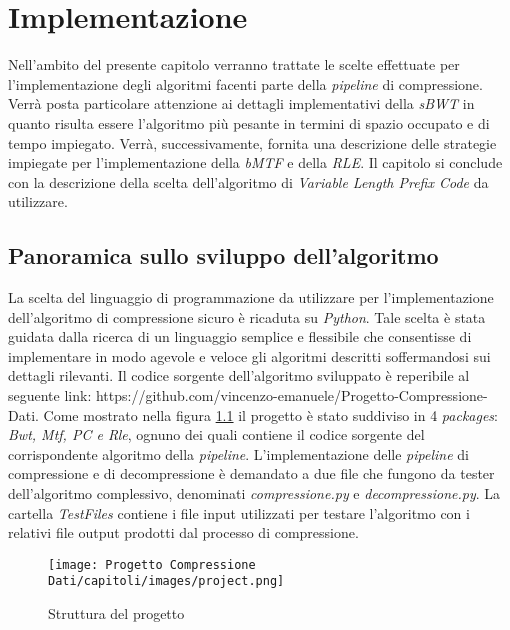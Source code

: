 \chapter{Implementazione} %
%

\begin{citazione}
Nell'ambito del presente capitolo verranno trattate le scelte effettuate per l'implementazione degli algoritmi facenti parte della \emph{pipeline} di compressione. Verrà posta particolare attenzione ai dettagli implementativi della \emph{sBWT} in quanto risulta essere l'algoritmo più pesante in termini di spazio occupato e di tempo impiegato. Verrà, successivamente, fornita una descrizione delle strategie impiegate per l'implementazione della \emph{bMTF} e della \emph{RLE}. Il capitolo si conclude con la descrizione della scelta dell'algoritmo di \emph{Variable Length Prefix Code} da utilizzare. 
\end{citazione}
\newpage

\section{Panoramica sullo sviluppo dell'algoritmo} 
La scelta del linguaggio di programmazione da utilizzare per l'implementazione dell'algoritmo di compressione sicuro è ricaduta su \emph{Python}. Tale scelta è stata guidata dalla ricerca di un linguaggio semplice e flessibile che consentisse di implementare in modo agevole e veloce gli algoritmi descritti soffermandosi sui dettagli rilevanti. Il codice sorgente dell'algoritmo sviluppato è reperibile al seguente link: https://github.com/vincenzo-emanuele/Progetto-Compressione-Dati. Come mostrato nella figura \ref{fig:project} il progetto è stato suddiviso in 4 \emph{packages}: \emph{Bwt, Mtf, PC e Rle}, ognuno dei quali contiene il codice sorgente del corrispondente algoritmo della \emph{pipeline}. L'implementazione delle \emph{pipeline} di compressione e di decompressione è demandato a due file che fungono da tester dell'algoritmo complessivo, denominati \emph{compressione.py} e \emph{decompressione.py}. La cartella \emph{TestFiles} contiene i file input utilizzati per testare l'algoritmo con i relativi file output prodotti dal processo di compressione.
\begin{figure}[h]
    \centering
    \texttt{[image: Progetto Compressione Dati/capitoli/images/project.png]}
\caption{Struttura del progetto}
    \label{fig:project}
\end{figure} \\
